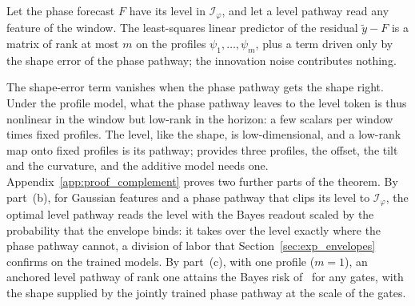 {\begin{theorem}
\label{thm:complement}
Let the phase forecast $F$ have its level in $\mathcal I_\varphi$, and let a level pathway read any feature of the window. The least-squares linear predictor of the residual $\tilde y-F$ is a matrix of rank at most $m$ on the profiles $\psi_1,\dots,\psi_m$, plus a term driven only by the shape error of the phase pathway; the innovation noise contributes nothing.
\end{theorem}

The shape-error term vanishes when the phase pathway gets the shape right. Under the profile model, what the phase pathway leaves to the level token is thus nonlinear in the window but low-rank in the horizon: a few scalars per window times fixed profiles. The level, like the shape, is low-dimensional, and a low-rank map onto fixed profiles is its pathway; \sysplus provides three profiles, the offset, the tilt and the curvature, and the additive model needs one. Appendix~\ref{app:proof_complement} proves two further parts of the theorem. By part~(b), for Gaussian features and a phase pathway that clips its level to $\mathcal I_\varphi$, the optimal level pathway reads the level with the Bayes readout scaled by the probability that the envelope binds: it takes over the level exactly where the phase pathway cannot, a division of labor that Section~\ref{sec:exp_envelopes} confirms on the trained models. By part~(c), with one profile ($m=1$), an anchored level pathway of rank one attains the Bayes risk of~ for any gates, with the shape supplied by the jointly trained phase pathway at the scale of the gates.

}

